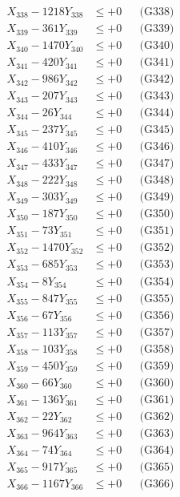 \documentclass[a4paper,10pt]{article}
\begin{document}
{\begin{align}
X_{338} - 1218Y_{338} &\leq +0 && \text{(G338)} \\
X_{339} - 361Y_{339} &\leq +0 && \text{(G339)} \\
X_{340} - 1470Y_{340} &\leq +0 && \text{(G340)} \\
\allowbreak
X_{341} - 420Y_{341} &\leq +0 && \text{(G341)} \\
X_{342} - 986Y_{342} &\leq +0 && \text{(G342)} \\
X_{343} - 207Y_{343} &\leq +0 && \text{(G343)} \\
X_{344} - 26Y_{344} &\leq +0 && \text{(G344)} \\
X_{345} - 237Y_{345} &\leq +0 && \text{(G345)} \\
X_{346} - 410Y_{346} &\leq +0 && \text{(G346)} \\
X_{347} - 433Y_{347} &\leq +0 && \text{(G347)} \\
X_{348} - 222Y_{348} &\leq +0 && \text{(G348)} \\
X_{349} - 303Y_{349} &\leq +0 && \text{(G349)} \\
X_{350} - 187Y_{350} &\leq +0 && \text{(G350)} \\
\allowbreak
X_{351} - 73Y_{351} &\leq +0 && \text{(G351)} \\
X_{352} - 1470Y_{352} &\leq +0 && \text{(G352)} \\
X_{353} - 685Y_{353} &\leq +0 && \text{(G353)} \\
X_{354} - 8Y_{354} &\leq +0 && \text{(G354)} \\
X_{355} - 847Y_{355} &\leq +0 && \text{(G355)} \\
X_{356} - 67Y_{356} &\leq +0 && \text{(G356)} \\
X_{357} - 113Y_{357} &\leq +0 && \text{(G357)} \\
X_{358} - 103Y_{358} &\leq +0 && \text{(G358)} \\
X_{359} - 450Y_{359} &\leq +0 && \text{(G359)} \\
X_{360} - 66Y_{360} &\leq +0 && \text{(G360)} \\
\allowbreak
X_{361} - 136Y_{361} &\leq +0 && \text{(G361)} \\
X_{362} - 22Y_{362} &\leq +0 && \text{(G362)} \\
X_{363} - 964Y_{363} &\leq +0 && \text{(G363)} \\
X_{364} - 74Y_{364} &\leq +0 && \text{(G364)} \\
X_{365} - 917Y_{365} &\leq +0 && \text{(G365)} \\
X_{366} - 1167Y_{366} &\leq +0 && \text{(G366)} \\

\end{align}}
\end{document}
